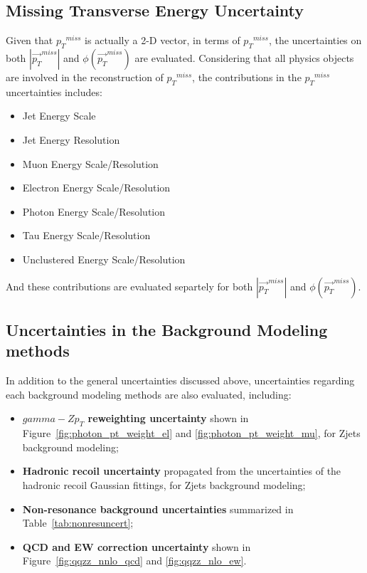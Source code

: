 \subsection{Missing Transverse Energy Uncertainty}
Given that ${p_{T}}^{miss}$ is actually a 2-D vector, in terms of ${p_{T}}^{miss}$, the uncertainties on both $|{\vec{p_{T}}^{miss}}|$ and $\phi({\vec{p_{T}}}^{miss})$ are evaluated. Considering that all physics objects are involved in the reconstruction of ${p_{T}}^{miss}$, the contributions in the ${p_{T}}^{miss}$ uncertainties includes:
\begin{itemize}
\item Jet Energy Scale
\item Jet Energy Resolution
\item Muon Energy Scale/Resolution
\item Electron Energy Scale/Resolution
\item Photon Energy Scale/Resolution
\item Tau Energy Scale/Resolution
\item Unclustered Energy Scale/Resolution
\end{itemize}

And these contributions are evaluated separtely for both $|{\vec{p_{T}}^{miss}}|$ and $\phi({\vec{p_{T}}}^{miss})$.
\subsection{Uncertainties in the Background Modeling methods}
In addition to the general uncertainties discussed above, uncertainties regarding each background modeling methods are also evaluated, including:
\begin{itemize}
\item \textbf{$gamma-Z p_T$ reweighting uncertainty} shown in Figure~\ref{fig:photon_pt_weight_el} and \ref{fig:photon_pt_weight_mu}, for Zjets background modeling;
\item \textbf{Hadronic recoil uncertainty} propagated from the uncertainties of the hadronic recoil Gaussian fittings, for Zjets background modeling;
\item \textbf{Non-resonance background uncertainties} summarized in Table~\ref{tab:nonresuncert};
\item \textbf{QCD and EW correction uncertainty} shown in Figure~\ref{fig:qqzz_nnlo_qcd} and \ref{fig:qqzz_nlo_ew}.
\end{itemize}

